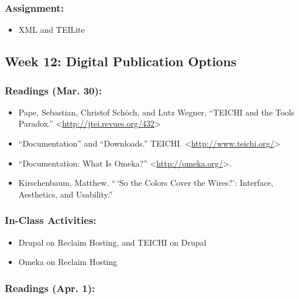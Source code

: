 \documentclass[]{article}
\begin{document}
\subsubsection{Assignment:}\label{assignment-2}

\begin{itemize}
\itemsep1pt\parskip0pt
\item
  XML and TEILite
\end{itemize}

\subsection{Week 12: Digital Publication
Options}\label{week-12-digital-publication-options}

\subsubsection{Readings (Mar. 30):}\label{readings-mar.-30}

\begin{itemize}
\itemsep1pt\parskip0pt
\item
  Pape, Sebastian, Christof Schöch, and Lutz Wegner, ``TEICHI and the
  Tools Paradox.''
  \textless{}\url{http://jtei.revues.org/432}\textgreater{}
\item
  ``Documentation'' and ``Downloads.'' TEICHI.
  \textless{}\url{http://www.teichi.org/}\textgreater{}
\item
  ``Documentation: What Is Omeka?''
  \textless{}\url{http://omeka.org/}\textgreater{}.
\item
  Kirschenbaum, Matthew. ``\,`So the Colors Cover the Wires?':
  Interface, Aesthetics, and Usability.''
\end{itemize}

\subsubsection{In-Class Activities:}\label{in-class-activities-2}

\begin{itemize}
\itemsep1pt\parskip0pt
\item
  Drupal on Reclaim Hosting, and TEICHI on Drupal
\item
  Omeka on Reclaim Hosting
\end{itemize}

\subsubsection{Readings (Apr. 1):}\label{readings-apr.-1}
\end{document}
